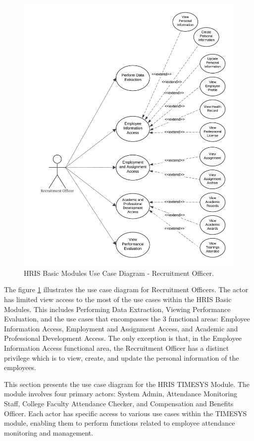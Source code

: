     \begin{figure}[H]
        \centering
        \includegraphics[width=0.9\linewidth]{figures/images/diagrams/usecase/use-case-basic-8.png}
        \caption{HRIS Basic Modules Use Case Diagram - Recruitment Officer.}
        \label{fig:use-case-basic-8}
    \end{figure}

    The figure \ref{fig:use-case-basic-8} illustrates the use case diagram for Recruitment Officers. The actor has limited view access to the most of the use cases within the HRIS Basic Modules. This includes Performing Data Extraction, Viewing Performance Evaluation, and the use cases that  encompasses the 3 functional areas: Employee Information Access, Employment and Assignment Access, and Academic and Professional Development Access. The only exception is that,  in the Employee Information Access functional area, the Recruitment Officer has a distinct privilege which is to view, create, and update the personal information of the employees.


    This section presents the use case diagram for the HRIS TIMESYS Module. The module involves four primary actors: System Admin, Attendance Monitoring Staff, College Faculty Attendance Checker, and Compensation and Benefits Officer. Each actor has specific access to various use cases within the TIMESYS module, enabling them to perform functions related to employee attendance monitoring and management.

